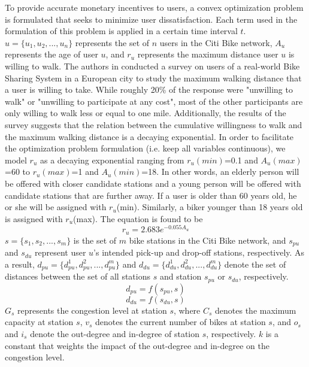 \documentclass[times, 10pt,twocolumn]{article}
\begin{document}
To provide accurate monetary incentives to users, a convex optimization problem is formulated that seeks to minimize user dissatisfaction. Each term used in the formulation of this problem is applied in a certain time interval $t$. $u = \{u_1, u_2, ..., u_n\}$ represents the set of $n$ users in the Citi Bike network, $A_u$ represents the age of user $u$, and $r_u$ represents the maximum distance user $u$ is willing to walk. The authors in \cite{incentives} conducted a survey on users of a real-world Bike Sharing System in a European city to study the maximum walking distance that a user is willing to take. While roughly 20\% of the response were "unwilling to walk" or "unwilling to participate at any cost", most of the other participants are only willing to walk less or equal to one mile. Additionally, the results of the survey suggests that the relation between the cumulative willingness to walk and the maximum walking distance is a decaying exponential. In order to facilitate the optimization problem formulation (i.e. keep all variables continuous), we model $r_u$ as a decaying exponential ranging from $r_u(min)$=0.1 and $A_u(max)$=60 to $r_u(max)$=1 and $A_u(min)$=18. In other words, an elderly person will be offered with closer candidate stations and a young person will be offered with candidate stations that are further away. If a user is older than 60 years old, he or she will be assigned with $r_u$(min). Similarly, a biker younger than 18 years old is assigned with $r_u$(max). The equation is found to be
\begin{equation}
r_u = 2.683e^{-0.055A_u}
\end{equation}
$s = \{s_1, s_2, ..., s_m\}$ is the set of $m$ bike stations in the Citi Bike network, and $s_{pu}$ and $s_{du}$ represent user $u$'s intended pick-up and drop-off stations, respectively. As a result, $d_{pu} = \{d_{pu}^1, d_{pu}^2, ..., d_{pu}^m\}$ and $d_{du} = \{d_{du}^1, d_{du}^2, ..., d_{du}^m\}$ denote the set of distances between the set of all stations $s$ and station $s_{pu}$ or $s_{du}$, respectively.
\begin{equation}
d_{pu} = f(s_{pu}, s)
\end{equation}
\begin{equation}
d_{du} = f(s_{du}, s)
\end{equation}
$G_s$ represents the congestion level at station $s$, where $C_s$ denotes the maximum capacity at station $s$, $v_s$ denotes the current number of bikes at station $s$, and $o_s$ and $i_s$ denote the out-degree and in-degree of station $s$, respectively. $k$ is a constant that weights the impact of the out-degree and in-degree on the congestion level.
\end{document}
